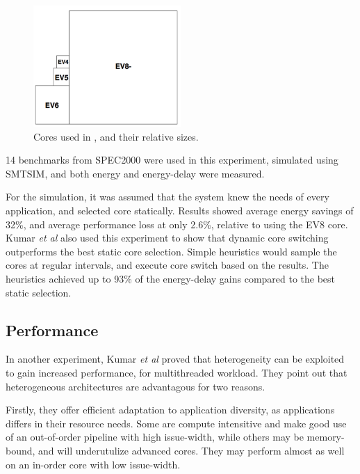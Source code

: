 \begin{figure}[htb]
    \centering
    \includegraphics[width=0.5\textwidth]{Figures/Heterogeneous/Kumar1}
    \caption{Cores used in \cite{heterogeneous-ee}, and their relative sizes.}
    \label{fig:Kumar1}
\end{figure}


14 benchmarks from SPEC2000 were used in this experiment, simulated using SMTSIM, and both energy and energy-delay were measured.

For the simulation, it was assumed that the system knew the needs of every application, and selected core statically. 
Results showed average energy savings of 32\%, and average performance loss at only 2.6\%, relative to using the EV8 core.
Kumar \textit{et al} also used this experiment to show that dynamic core switching outperforms the best static core selection.
Simple heuristics would sample the cores at regular intervals, and execute core switch based on the results.
The heuristics achieved up to 93\% of the energy-delay gains compared to the best static selection. 

\subsection{Performance}
\label{subsec:rw_perf}
In another experiment, Kumar \textit{et al}\cite{heterogeneous-perf} proved that heterogeneity can be exploited to gain increased performance, for multithreaded workload.
They point out that heterogeneous architectures are advantagous for two reasons.

Firstly, they offer efficient adaptation to application diversity, as applications differs in their resource needs.
Some are compute intensitive and make good use of an out-of-order pipeline with high issue-width, while others may be memory-bound, and will underutulize advanced cores.
They may perform almost as well on an in-order core with low issue-width\cite{heterogeneous-perf}.

